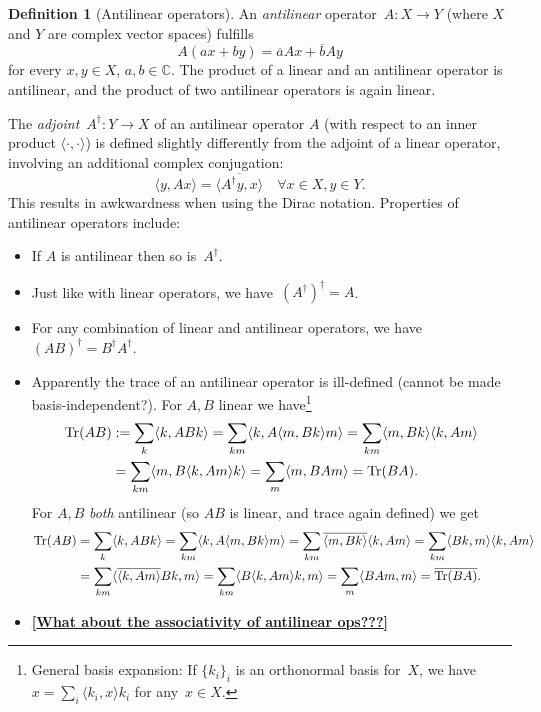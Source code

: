 \documentclass[aps,pra,12pt,nofootinbib,superscriptaddress,longbibliography,showpacs]{revtex4-1}
\newcommand{\todo}[1]{\textbf{\underline{\textcolor{dblue}{\textbf{[}#1\textbf{]}}}}}
\theoremstyle{plain}
\theoremstyle{definition}
\newtheorem{definition}[theorem]{Definition}
\newcommand{\iprod}[2]{\ensuremath{\langle #1,#2 \rangle}}
\DeclareMathOperator{\Tr}{Tr}
\newcommand{\CC}{{\mathbb C}}  %
\newcommand{\be}{\begin{equation}}
\newcommand{\ee}{\end{equation}}
\begin{document}
\begin{definition}[Antilinear operators]
An \emph{antilinear} operator~$A: X \to Y$
(where $X$ and $Y$ are complex vector spaces) fulfills
\be
A(a x +b y) = \overline{a} Ax +\overline{b}Ay
\ee
for every $x,y \in X$, $a,b \in \CC$.
The product of a linear and an antilinear operator is antilinear, and
the product of two antilinear operators is again linear.

The \emph{adjoint}~$A^\dagger: Y \to X$ of an antilinear operator $A$
(with respect to an inner product $\iprod{\cdot}{\cdot}$)
is defined slightly differently from the adjoint of a linear operator, involving an
additional complex conjugation:
\be
\iprod{y}{Ax} = \overline{\iprod{A^\dagger y}{x}} \quad \forall x \in X, y \in Y.
\ee
This results in awkwardness when using the Dirac notation. Properties of antilinear operators include:
\begin{itemize}
\item
If $A$ is antilinear then so is~$A^\dagger$.

\item
Just like with linear operators, we
have~$(A^\dagger)^\dagger = A$.

\item
For any combination of linear and antilinear operators, we
have~$(AB)^\dagger = B^\dagger A^\dagger$.

\item
Apparently the trace of an antilinear operator is ill-defined (cannot
be made basis-independent?).
For $A, B$ linear we have\footnote{General basis expansion: If $\{k_i\}_i$ is an orthonormal basis for~$X$, we have
  $x = \sum_i \iprod{k_i}{x}k_i$ for any~$x \in X$.}
\begin{align}
\notag
\Tr(AB)
&:= \sum_k \iprod{k}{ABk}
= \sum_{km} \iprod{k}{A \iprod{m}{Bk}m}
= \sum_{km} \iprod{m}{Bk} \iprod{k}{Am}\\
&= \sum_{km} \iprod{m}{B\iprod{k}{Am}k}
= \sum_{m} \iprod{m}{BAm}
= \Tr(BA).
\end{align}
For $A, B$ \emph{both} antilinear (so $AB$ is linear, and trace again defined) we get
\begin{align}
\notag
\Tr(AB)
&= \sum_k \iprod{k}{ABk}
= \sum_{km} \iprod{k}{A \iprod{m}{Bk}m}
= \sum_{km} \overline{\iprod{m}{Bk}} \iprod{k}{Am}
= \sum_{km} \iprod{Bk}{m} \iprod{k}{Am}\\
&= \sum_{km} \iprod{\overline{\iprod{k}{Am}} Bk}{m}
= \sum_{km} \iprod{B \iprod{k}{Am}k}{m}
= \sum_{m} \iprod{B Am}{m}
= \overline{\Tr(BA)}.
\end{align}

\item
\todo{What about the associativity of antilinear ops???}
\end{itemize}
\end{definition}
\end{document}
